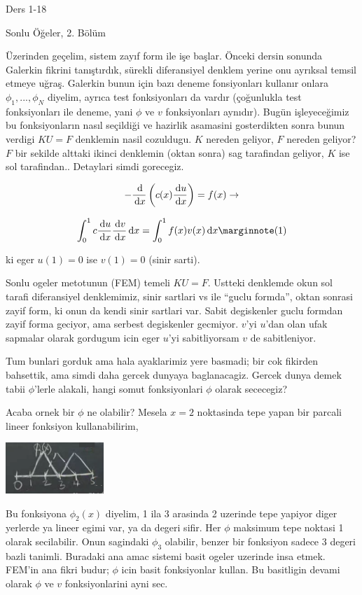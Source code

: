 \documentclass[12pt,fleqn]{article}\usepackage{../../common}
\begin{document}
Ders 1-18

Sonlu Öğeler, 2. Bölüm

Üzerinden geçelim, sistem zayıf form ile işe başlar. Önceki dersin sonunda
Galerkin fikrini tanıştırdık, sürekli diferansiyel denklem yerine onu ayrıksal
temsil etmeye uğraş. Galerkin bunun için bazı deneme fonsiyonları kullanır
onlara $\phi_1,...,\phi_N$ diyelim, ayrıca test fonksiyonları da vardır
(çoğunlukla test fonksiyonları ile deneme, yani $\phi$ ve $v$ fonksiyonları
aynıdır). Bugün işleyeceğimiz bu fonksiyonların nasıl seçildiği ve hazirlik
asamasini gosterdikten sonra bunun verdigi $KU = F$ denklemin nasil
cozuldugu. $K$ nereden geliyor, $F$ nereden geliyor? $F$ bir sekilde alttaki
ikinci denklemin (oktan sonra) sag tarafindan geliyor, $K$ ise sol
tarafindan.. Detaylari simdi gorecegiz.

$$
- \frac{\,\mathrm{d}}{\,\mathrm{d} x} \left( c(x) \frac{\,\mathrm{d} u}{\,\mathrm{d} x} \right) = f(x) \to
$$

$$
\int _{0}^{1} c \frac{\ud u}{\ud x} \frac{\ud v}{\ud x} \ud x =
\int _{0}^{1} f(x) v(x) \ud x
\mlabel{1}
$$

ki eger $u(1)=0$ ise $v(1) = 0$ (sinir sarti).

Sonlu ogeler metotunun (FEM) temeli $KU = F$. Ustteki denklemde okun sol tarafi
diferansiyel denklemimiz, sinir sartlari vs ile ``guclu formda'', oktan sonrasi
zayif form, ki onun da kendi sinir sartlari var. Sabit degiskenler guclu formdan
zayif forma geciyor, ama serbest degiskenler gecmiyor. $v$'yi $u$'dan olan ufak
sapmalar olarak gordugum icin eger $u$'yi sabitliyorsam $v$ de sabitleniyor.

Tum bunlari gorduk ama hala ayaklarimiz yere basmadi; bir cok fikirden
bahsettik, ama simdi daha gercek dunyaya baglanacagiz. Gercek dunya demek tabii
$\phi$'lerle alakali, hangi somut fonksiyonlari $\phi$ olarak sececegiz?

Acaba ornek bir $\phi$ ne olabilir? Mesela $x=2$ noktasinda tepe yapan bir
parcali lineer fonksiyon kullanabilirim,

\includegraphics[width=10em]{compscieng_1_18_01.png}

Bu fonksiyona $\phi_2(x)$ diyelim, 1 ila 3 arasinda 2 uzerinde tepe yapiyor
diger yerlerde ya lineer egimi var, ya da degeri sifir. Her $\phi$ maksimum tepe
noktasi 1 olarak secilabilir. Onun sagindaki $\phi_3$ olabilir, benzer bir
fonksiyon sadece 3 degeri bazli tanimli. Buradaki ana amac sistemi basit ogeler
uzerinde insa etmek. FEM'in ana fikri budur; $\phi$ icin basit fonksiyonlar
kullan. Bu basitligin devami olarak $\phi$ ve $v$ fonksiyonlarini ayni sec.
\end{document}
